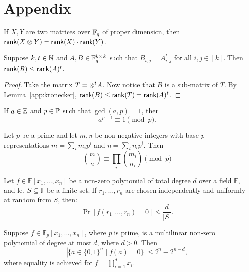 \chapter{Appendix}\label{app}

\begin{lemma}\label{app:kronecker}
    If $X, Y$ are two matrices over $\mathbb{F}_q$ of proper dimension, then $\mathsf{rank}(X\otimes Y) = \mathsf{rank}(X)\cdot\mathsf{rank}(Y)$.
\end{lemma}

\begin{lemma}\label{app:matrix power}
    Suppose $k, t\in\mathbb{N}$ and $A, B\in\mathbb{F}_q^{k\times k}$ such that $B_{i,j} = A_{i,j}^t$ for all $i,j\in[k]$. Then $\mathsf{rank}(B) \leq \mathsf{rank}(A)^t$.
\end{lemma}
\begin{proof}
    Take the matrix $T = \otimes^{t}A$. Now notice that $B$ is a sub-matrix of $T$. By Lemma~\ref{app:kronecker}, $\mathsf{rank}(B)\leq\mathsf{rank}(T) = \mathsf{rank}(A)^t$.
\end{proof}

\begin{lemma}\label{app:fermat}
    If $a\in\mathbb{Z}$ and $p\in\mathbb{P}$ such that $\gcd(a,p) = 1$, then 
    \[
            a^{p-1} \equiv 1 \pmod p.
    \]  
\end{lemma}

\begin{theorem}
\label{app:lucas}
Let $p$ be a prime and let $m, n$ be non-negative integers with base-$p$ representations
$m = \sum_{i} m_i p^i$ and $n = \sum_{i} n_i p^i$. Then
\[
\binom{m}{n} \equiv \prod_{i} \binom{m_i}{n_i} \pmod{p}
\]
\end{theorem}


\begin{lemma}
\label{app:sz}
Let $f \in \mathbb{F}[x_1, \ldots, x_n]$ be a non-zero polynomial of total degree $d$ over a field $\mathbb{F}$, and let $S \subseteq \mathbb{F}$ be a finite set. If $r_1, \ldots, r_n$ are chosen independently and uniformly at random from $S$, then:
\[
\Pr[f(r_1, \ldots, r_n) = 0] \leq \frac{d}{|S|}.
\]
\end{lemma}

\begin{lemma}\label{app:spl_sz}
Suppose $f \in \mathbb{F}_p[x_1, \ldots, x_n]$, where $p$ is prime, is a multilinear non-zero polynomial of degree at most $d$, where $d > 0$. Then:
\[
|\{a \in \{0,1\}^n \mid f(a) = 0\}| \leq 2^n - 2^{n-d},
\]
where equality is achieved for $f = \prod_{i=1}^{d} x_i$.
\end{lemma}


